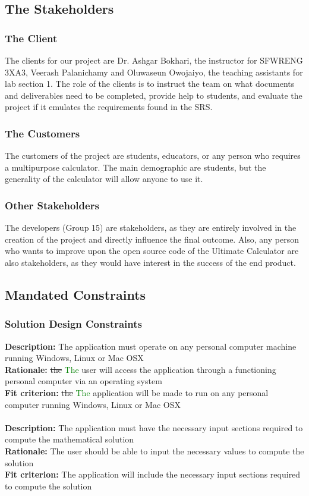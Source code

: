 \documentclass[12pt, titlepage]{article}
\begin{document}
\subsection{The Stakeholders}

\subsubsection{The Client}
The clients for our project are Dr. Ashgar Bokhari, the instructor for SFWRENG 3XA3, Veerash Palanichamy and Oluwaseun Owojaiyo, the teaching assistants for lab section 1. The role of the clients is to instruct the team on what documents and deliverables need to be completed, provide help to students, and evaluate the project if it emulates the requirements found in the SRS.

\subsubsection{The Customers}
The customers of the project are students, educators, or any person who requires a multipurpose calculator. The main demographic are students, but the generality of the calculator will allow anyone to use it.
\subsubsection{Other Stakeholders}
The developers (Group 15) are stakeholders, as they are entirely involved in the creation of the project and directly influence the final outcome. Also, any person who wants to improve upon the open source code of the Ultimate Calculator are also stakeholders, as they would have interest in the success of the end product.
\subsection{Mandated Constraints}

\subsubsection{Solution Design Constraints}
\textbf{Description:} The application must operate on any personal computer machine running 
Windows, Linux or Mac OSX\\ 
\textbf{Rationale:} \sout{the} \textcolor{Green}{The} user will access the application through a functioning personal computer via an operating system\\
\textbf{Fit criterion:} \sout{the} \textcolor{Green}{The} application will be made to run on any personal computer running Windows, Linux or Mac OSX
\medskip\\
\\
\textbf{Description:} The application must have the necessary input sections required to compute the mathematical solution\\
\textbf{Rationale:} The user should be able to input the necessary values to compute the solution\\
\textbf{Fit criterion:} The application will include the necessary input sections required to compute the solution
\end{document}
